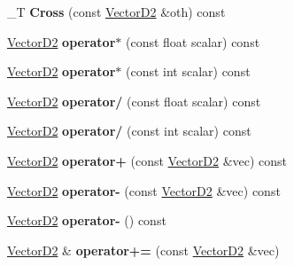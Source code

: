 \begin{DoxyCompactItemize}
\item 
\hypertarget{struct_vector_d2_a33ebb54bddcf41bbd3a5e78470dce5ba}{
\_\-T {\bfseries Cross} (const \hyperlink{struct_vector_d2}{VectorD2} \&oth) const }
\label{struct_vector_d2_a33ebb54bddcf41bbd3a5e78470dce5ba}

\item 
\hypertarget{struct_vector_d2_a223bf9d7ce858169eda6df71ce3863f9}{
\hyperlink{struct_vector_d2}{VectorD2} {\bfseries operator$\ast$} (const float scalar) const }
\label{struct_vector_d2_a223bf9d7ce858169eda6df71ce3863f9}

\item 
\hypertarget{struct_vector_d2_a5e55eed6cb0a1f51acd5704f66a7fb28}{
\hyperlink{struct_vector_d2}{VectorD2} {\bfseries operator$\ast$} (const int scalar) const }
\label{struct_vector_d2_a5e55eed6cb0a1f51acd5704f66a7fb28}

\item 
\hypertarget{struct_vector_d2_abd0876025cdd3ae5bca322285aab9b84}{
\hyperlink{struct_vector_d2}{VectorD2} {\bfseries operator/} (const float scalar) const }
\label{struct_vector_d2_abd0876025cdd3ae5bca322285aab9b84}

\item 
\hypertarget{struct_vector_d2_abec920e6839c42a6b231e8b2a2e65561}{
\hyperlink{struct_vector_d2}{VectorD2} {\bfseries operator/} (const int scalar) const }
\label{struct_vector_d2_abec920e6839c42a6b231e8b2a2e65561}

\item 
\hypertarget{struct_vector_d2_a055c614e5e1263e4ba06abbced8036b5}{
\hyperlink{struct_vector_d2}{VectorD2} {\bfseries operator+} (const \hyperlink{struct_vector_d2}{VectorD2} \&vec) const }
\label{struct_vector_d2_a055c614e5e1263e4ba06abbced8036b5}

\item 
\hypertarget{struct_vector_d2_a4f89ac59969374c3a8bd212511552ccb}{
\hyperlink{struct_vector_d2}{VectorD2} {\bfseries operator-\/} (const \hyperlink{struct_vector_d2}{VectorD2} \&vec) const }
\label{struct_vector_d2_a4f89ac59969374c3a8bd212511552ccb}

\item 
\hypertarget{struct_vector_d2_a3b4ed1b8757879c9851aacddb39b38dc}{
\hyperlink{struct_vector_d2}{VectorD2} {\bfseries operator-\/} () const }
\label{struct_vector_d2_a3b4ed1b8757879c9851aacddb39b38dc}

\item 
\hypertarget{struct_vector_d2_af9f98b5dae3f24462a146a1f8a0d669e}{
\hyperlink{struct_vector_d2}{VectorD2} \& {\bfseries operator+=} (const \hyperlink{struct_vector_d2}{VectorD2} \&vec)}
\label{struct_vector_d2_af9f98b5dae3f24462a146a1f8a0d669e}


\end{DoxyCompactItemize}
